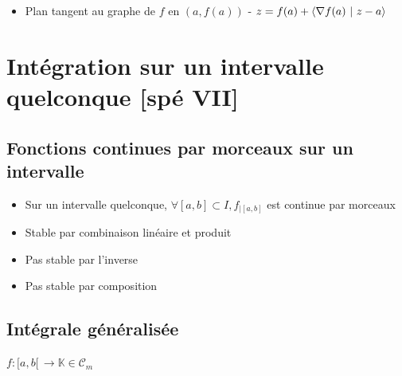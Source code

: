 \documentclass[openany]{book}
\begin{document}
\begin{itemize}
    \item Plan tangent au graphe de $f$ en $(a, f(a))$ - $z = f(a) + \langle \nabla f(a) \text{ } | \text{ } z-a \rangle$
\end{itemize}

\clearpage

\section{Intégration sur un intervalle quelconque [spé VII]}
\subsection{Fonctions continues par morceaux sur un intervalle}

\begin{itemize}
    \item Sur un intervalle quelconque, $\forall [a, b] \subset I, f_{|[a, b]} $ est continue par morceaux 
    \item Stable par combinaison linéaire et produit
    \item Pas stable par l'inverse
    \item Pas stable par composition
\end{itemize}

\subsection{Intégrale généralisée}

$f : [a, b[ \, \rightarrow \mathbb{K} \in \mathcal{C}_{m}$
\end{document}
